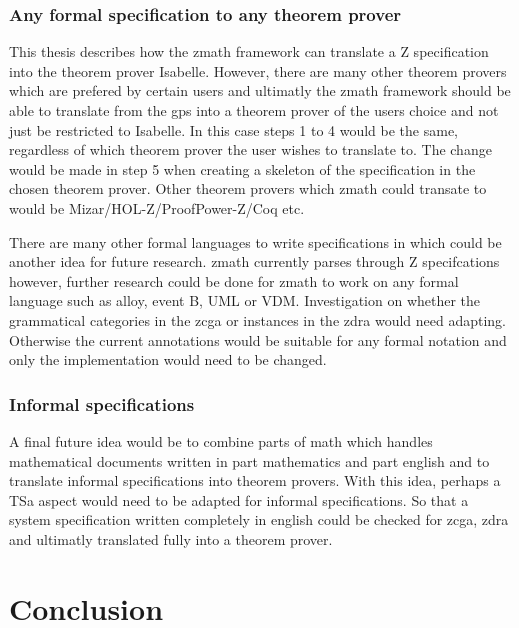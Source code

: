 \subsubsection{Any formal specification to any theorem prover}
\label{subsubsec:anyformanythe}

This thesis describes how the \gls{zmath} framework can translate a Z specification into the theorem prover Isabelle. However, there are many other theorem provers which are prefered by certain users and ultimatly the \gls{zmath} framework should be able to translate from the \gls{gps} into a theorem prover of the users choice and not just be restricted to Isabelle. In this case steps 1 to 4 would be the same, regardless of which theorem prover the user wishes to translate to. The change would be made in step 5 when creating a skeleton of the specification in the chosen theorem prover. Other theorem provers which \gls{zmath} could transate to would be Mizar/HOL-Z/ProofPower-Z/Coq etc.

There are many other formal languages to write specifications in which could be another idea for future research. \Gls{zmath} currently parses through Z specifcations however, further research could be done for \gls{zmath} to work on any formal language such as alloy, event B, UML or VDM. Investigation on whether the grammatical categories in the \gls{zcga} or instances in the \gls{zdra} would need adapting. Otherwise the current annotations would be suitable for any formal notation and only the implementation would need to be changed.

\subsubsection{Informal specifications}
\label{subsubsec:informalspecs}

A final future idea would be to combine parts of \gls{math} which handles mathematical documents written in part mathematics and part english and to translate informal specifications into theorem provers. With this idea, perhaps a TSa aspect would need to be adapted for informal specifications. So that a system specification written completely in english could be checked for \gls{zcga}, \gls{zdra} and ultimatly translated fully into a theorem prover.


\section{Conclusion}
\label{sec:conclusion}

